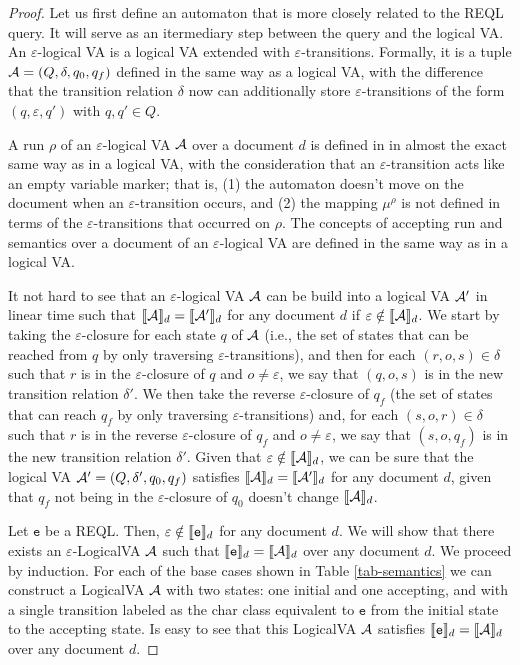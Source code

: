 \begin{proof}
	Let us first define an automaton that is more closely related to the REQL
	query. It will serve as an itermediary step between the query and the
	logical VA. An $\varepsilon$-logical VA is a logical VA extended with
	$\varepsilon$-transitions. Formally, it is a tuple $\mathcal{A} = (Q, \delta, q_0,
	q_f)$ defined in the same way as a logical VA, with the difference that the
	transition relation $\delta$ now can additionally store
	$\varepsilon$-transitions of the form $(q, \varepsilon, q')$ with $q, q' \in
	Q$.

	A run $\rho$ of an $\varepsilon$-logical VA $\mathcal{A}$ over a document $d$ is
	defined in in almost the exact same way as in a logical VA, with the
	consideration that an $\varepsilon$-transition acts like an empty variable
	marker; that is, (1) the automaton doesn't move on the document when an
	$\varepsilon$-transition occurs, and (2) the mapping $\mu^\rho$ is not
	defined in terms of the $\varepsilon$-transitions that occurred on $\rho$.
	The concepts of accepting run and semantics over a document of an
	$\varepsilon$-logical VA are defined in the same way as in a logical VA.

	It not hard to see that an $\varepsilon$-logical VA $\mathcal{A}$ can be build into
	a logical VA $\mathcal{A}'$ in linear time such that $\llbracket\mathcal{A}\rrbracket_{d} = \llbracket\mathcal{A}'\rrbracket_{d}$ for
	any document $d$ if $\varepsilon \notin \llbracket\mathcal{A}\rrbracket_{d}$. We start by taking the
	$\varepsilon$-closure for each state $q$ of $\mathcal{A}$ (i.e., the set of states
	that can be reached from $q$ by only traversing $\varepsilon$-transitions),
	and then for each $(r, o, s) \in \delta$ such that $r$ is in the
	$\varepsilon$-closure of $q$ and $o \neq \varepsilon$, we say that $(q, o,
	s)$ is in the new transition relation $\delta'$. We then take the reverse
	$\varepsilon$-closure of $q_f$ (the set of states that can reach $q_f$ by
	only traversing $\varepsilon$-transitions) and, for each $(s, o, r) \in
	\delta$ such that $r$ is in the reverse $\varepsilon$-closure of $q_f$ and
	$o \neq \varepsilon$, we say that $(s, o, q_f)$ is in the new transition
	relation $\delta'$. Given that $\varepsilon \notin \llbracket\mathcal{A}\rrbracket_{d}$, we can be
	sure that the logical VA $\mathcal{A}' = (Q, \delta', q_0, q_f)$ satisfies
	$\llbracket\mathcal{A}\rrbracket_{d} = \llbracket\mathcal{A}'\rrbracket_{d}$ for any document $d$, given that $q_f$ not being
	in the $\varepsilon$-closure of $q_0$ doesn't change $\llbracket\mathcal{A}\rrbracket_{d}$.

	Let $\texttt{e}$ be a REQL. Then, $\varepsilon \notin \llbracket\texttt{e}\rrbracket_{d}$ for
	any document $d$. We will show that there exists an $\varepsilon$-LogicalVA
	$\mathcal{A}$ such that $\llbracket\texttt{e}\rrbracket_d = \llbracket\mathcal{A}\rrbracket_d$ over any document $d$. We
	proceed by induction. For each of the base cases shown in Table
	\ref*{tab-semantics} we can construct a LogicalVA $\mathcal{A}$ with two states: one
	initial and one accepting, and with a single transition labeled as the char
	class equivalent to $\texttt{e}$ from the initial state to the accepting
	state. Is easy to see that this LogicalVA $\mathcal{A}$ satisfies
	$\llbracket\texttt{e}\rrbracket_d = \llbracket\mathcal{A}\rrbracket_d$ over any document $d$.


\end{proof}

